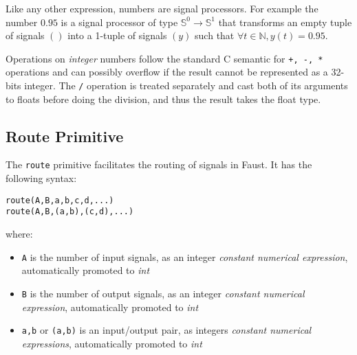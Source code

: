 Like any other \faust expression, numbers are signal processors. For example the number $0.95$ is a signal processor of type $\mathbb{S}^{0}\rightarrow\mathbb{S}^{1}$ that transforms an empty tuple of signals $()$ into a 1-tuple of signals $(y)$ such that $\forall t\in\mathbb{N}, y(t)=0.95$.

Operations on \textit{integer} numbers follow the standard C semantic for \lstinline'+, -, *' operations and can possibly overflow if the result cannot be represented as a 32-bits integer. The \lstinline'/' operation is treated separately and cast both of its arguments to floats before doing the division, and thus the result takes the float type.



\subsection{Route Primitive }

The  \lstinline'route' primitive facilitates the routing of signals in Faust. It has the following syntax:

\begin{lstlisting}
route(A,B,a,b,c,d,...)
route(A,B,(a,b),(c,d),...)
\end{lstlisting}

where:

\begin{itemize}
	\item \lstinline'A' is the number of input signals, as an integer \textit{constant numerical expression}, automatically promoted to \textit{int}
	\item \lstinline'B' is the number of output signals, as an integer \textit{constant numerical expression}, automatically promoted to \textit{int}
	\item \lstinline'a,b' or \lstinline'(a,b)' is an input/output pair, as integers \textit{constant numerical expressions}, automatically promoted to \textit{int}
\end{itemize}

